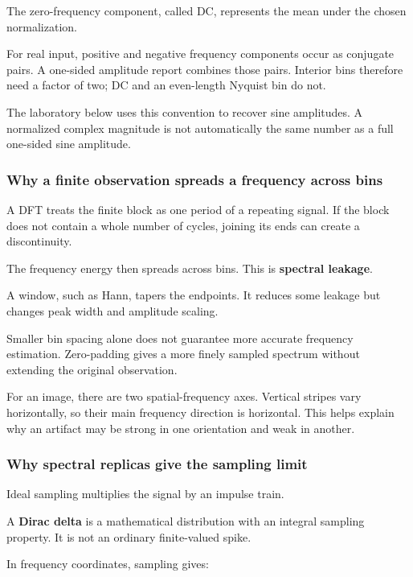 The zero-frequency component, called DC, represents the mean under the chosen normalization.

For real input, positive and negative frequency components occur as conjugate pairs. A one-sided amplitude report combines those pairs. Interior bins therefore need a factor of two; DC and an even-length Nyquist bin do not.

The laboratory below uses this convention to recover sine amplitudes. A normalized complex magnitude is not automatically the same number as a full one-sided sine amplitude.

\subsubsection{Why a finite observation spreads a frequency across bins}\label{04-visual-computing-ii-ch043-why-a-finite-observation-spreads-a-frequency-across-bins}

A DFT treats the finite block as one period of a repeating signal. If the block does not contain a whole number of cycles, joining its ends can create a discontinuity.

The frequency energy then spreads across bins. This is \textbf{spectral leakage}.

A window, such as Hann, tapers the endpoints. It reduces some leakage but changes peak width and amplitude scaling.

Smaller bin spacing alone does not guarantee more accurate frequency estimation. Zero-padding gives a more finely sampled spectrum without extending the original observation.

For an image, there are two spatial-frequency axes. Vertical stripes vary horizontally, so their main frequency direction is horizontal. This helps explain why an artifact may be strong in one orientation and weak in another.

\subsubsection{Why spectral replicas give the sampling limit}\label{04-visual-computing-ii-ch043-why-spectral-replicas-give-the-sampling-limit}

Ideal sampling multiplies the signal by an impulse train.

A \textbf{Dirac delta} is a mathematical distribution with an integral sampling property. It is not an ordinary finite-valued spike.

In frequency coordinates, sampling gives:

